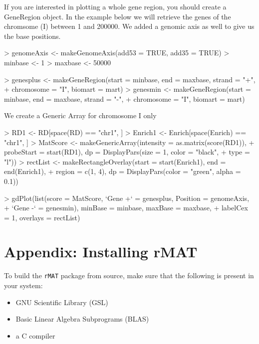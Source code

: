 \documentclass[11pt]{article}
\begin{document}
If you are interested in plotting a whole gene region, you should create a GeneRegion object.
In the example below we will retrieve the genes of the chromsome (I) between 1 and 200000. We added a genomic axis as well to give us the base positions.

\begin{Schunk}
\begin{Sinput}
> genomeAxis <- makeGenomeAxis(add53 = TRUE, add35 = TRUE)
> minbase <- 1
> maxbase <- 50000
\end{Sinput}
\end{Schunk}

\begin{Schunk}
\begin{Sinput}
> genesplus <- makeGeneRegion(start = minbase, end = maxbase, strand = "+", 
+     chromosome = "I", biomart = mart)
> genesmin <- makeGeneRegion(start = minbase, end = maxbase, strand = "-", 
+     chromosome = "I", biomart = mart)
\end{Sinput}
\end{Schunk}
We create a Generic Array for chromosome I only 

\begin{Schunk}
\begin{Sinput}
> RD1 <- RD[space(RD) == "chr1", ]
> Enrich1 <- Enrich[space(Enrich) == "chr1", ]
> MatScore <- makeGenericArray(intensity = as.matrix(score(RD1)), 
+     probeStart = start(RD1), dp = DisplayPars(size = 1, color = "black", 
+         type = "l"))
> rectList <- makeRectangleOverlay(start = start(Enrich1), end = end(Enrich1), 
+     region = c(1, 4), dp = DisplayPars(color = "green", alpha = 0.1))
\end{Sinput}
\end{Schunk}

\begin{Schunk}
\begin{Sinput}
> gdPlot(list(score = MatScore, `Gene +` = genesplus, Position = genomeAxis, 
+     `Gene -` = genesmin), minBase = minbase, maxBase = maxbase, 
+     labelCex = 1, overlays = rectList)
\end{Sinput}
\end{Schunk}


\part{Appendix: Installing rMAT}

To build the \texttt{rMAT} package from source, make sure that the following is present in your system:
\begin{itemize}
\item GNU Scientific Library (GSL)
\item Basic Linear Algebra Subprograms (BLAS)
\item a C compiler
\end{itemize}
\end{document}
